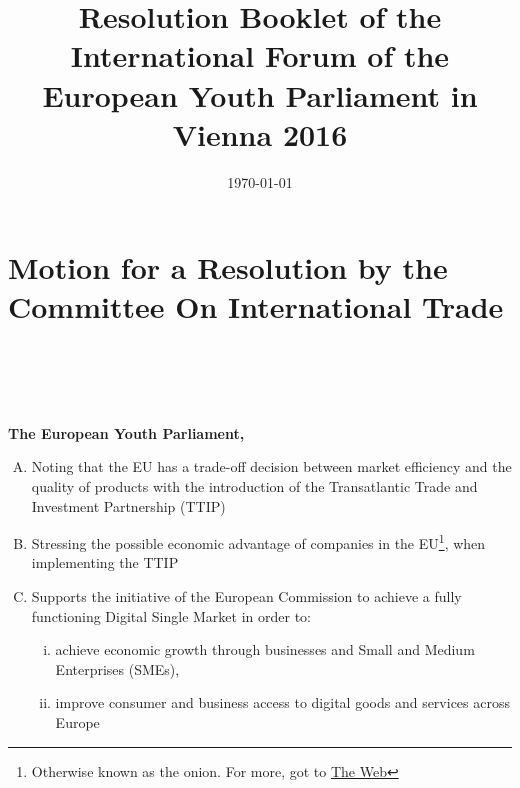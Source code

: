 \documentclass{resolution}
\title{Resolution Booklet of the International Forum of the European Youth Parliament in Vienna 2016}
\date{\today}
\begin{document}
\maketitle

\clearpage

\tableofcontents

\clearpage

\section{Motion for a Resolution by the Committee On International Trade}

\\~\\

\\~\\

\textbf{The European Youth Parliament,}

\begin{enumerate}[A.]
\item Noting that the EU has a trade-off decision between market efficiency and the quality of products with the introduction of the Transatlantic Trade and Investment Partnership (TTIP)
\item Stressing the possible economic advantage of companies in the EU\footnote{Otherwise known as the onion. For more, got to \href{http://google.com}{The Web}}, when implementing the TTIP
\item Supports the initiative of the European Commission to achieve a fully functioning Digital Single Market
 in order to:
 	\begin{enumerate}[i.]
		\item achieve economic growth through businesses and Small and Medium Enterprises (SMEs),
		\item improve consumer and business access to digital goods and services across Europe
	\end{enumerate}
\end{enumerate}
\end{document}
